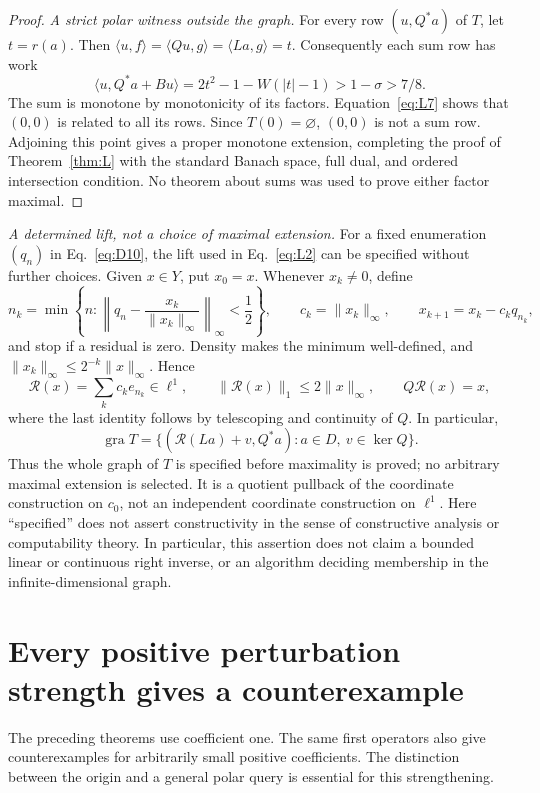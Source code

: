 \documentclass[11pt]{article}
\newcommand{\gra}{\operatorname{gra}}
\newcommand{\pair}[2]{\langle #1,#2\rangle}
\begin{document}
\begin{proof}
\noindent\textit{A strict polar witness outside the graph.}
\label{sec:L5}
For every row $(u,Q^*a)$ of $T$, let $t=r(a)$. Then
$\pair{u}{f}=\pair{Qu}{g}=\pair{La}{g}=t$.
Consequently each sum row has work
\begin{equation}
\pair{u}{Q^*a+Bu}
 =2t^2-1-W(|t|-1)>1-\sigma>7/8.
\tag{L7}\label{eq:L7}
\end{equation}
The sum is monotone by monotonicity of its factors.
Equation~\eqref{eq:L7} shows that $(0,0)$ is related to all its rows.
Since $T(0)=\varnothing$, $(0,0)$ is not a sum row. Adjoining this point
gives a proper monotone extension, completing the proof of
Theorem~\ref{thm:L} with the standard Banach space, full dual, and ordered
intersection condition. No theorem about sums was used to prove either
factor maximal.
\end{proof}

\noindent\textit{A determined lift, not a choice of maximal extension.}
For a fixed enumeration $(q_n)$ in Eq.~\eqref{eq:D10}, the lift used in
Eq.~\eqref{eq:L2} can be specified without further choices. Given $x\in Y$,
put $x_0=x$. Whenever $x_k\ne0$, define
\[
n_k=\min\left\{n:\left\|q_n-\frac{x_k}{\|x_k\|_\infty}\right\|_\infty
 <\frac12\right\},\qquad
c_k=\|x_k\|_\infty,\qquad x_{k+1}=x_k-c_kq_{n_k},
\]
and stop if a residual is zero. Density makes the minimum well-defined,
and $\|x_k\|_\infty\le2^{-k}\|x\|_\infty$. Hence
\[
\mathcal R(x)=\sum_k c_ke_{n_k}\in\ell^1,\qquad
\|\mathcal R(x)\|_1\le2\|x\|_\infty,\qquad
Q\mathcal R(x)=x,
\]
where the last identity follows by telescoping and continuity of $Q$.
In particular,
\[
\gra T=\{(\mathcal R(La)+v,Q^*a):a\in D,\ v\in\ker Q\}.
\]
Thus the whole graph of $T$ is specified before maximality is proved;
no arbitrary maximal extension is selected. It is a quotient pullback of
the coordinate construction on $c_0$, not an independent coordinate
construction on $\ell^1$. Here ``specified'' does not assert constructivity
in the sense of constructive analysis or computability theory. In particular,
this assertion does not
claim a bounded linear or continuous right inverse, or an algorithm
deciding membership in the infinite-dimensional graph.
\fi



\ifdefined\expandedversion


\section{Every positive perturbation strength gives a counterexample}
\label{sec:parameters}
The preceding theorems use coefficient one. The same first operators
also give counterexamples for arbitrarily small positive coefficients.
The distinction between the origin and a general polar query is essential
for this strengthening.
\end{document}
